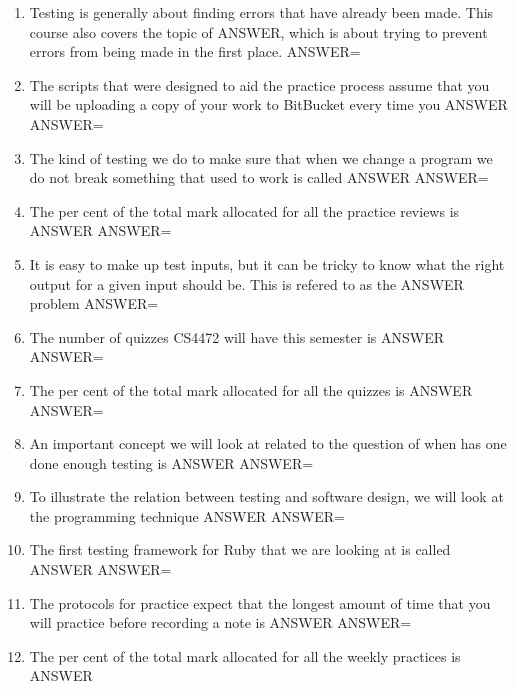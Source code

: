 \documentclass{exam}
\begin{document}
\begin{enumerate}
\item Testing is generally about finding errors that have already been made.  This course also covers the topic of ANSWER, which is about trying to prevent errors from being made in the first place.\newline
ANSWER=
\item The scripts that were designed to aid the practice process assume that you will be uploading a copy of your work to BitBucket every time you ANSWER\newline
ANSWER=
\item The kind of testing we do to make sure that when we change a program we do not break something that used to work is called ANSWER\newline
ANSWER=
\item The per cent of the total mark allocated for all the practice reviews is ANSWER\newline
ANSWER=
\item It is easy to make up test inputs, but it can be tricky to know what the right output for a given input should be.  This is refered to as the ANSWER problem\newline
ANSWER=
\item The number of quizzes CS4472 will have this semester is ANSWER\newline
ANSWER=
\item The per cent of the total mark allocated for all the quizzes is ANSWER\newline
ANSWER=
\item An important concept we will look at related to the question of when has one done enough testing is ANSWER\newline
ANSWER=
\item To illustrate the relation between testing and software design, we will look at the programming technique ANSWER\newline
ANSWER=
\item The first testing framework for Ruby that we are looking at is called ANSWER\newline
ANSWER=
\item The protocols for practice expect that the longest amount of time that you will practice before recording a note is ANSWER\newline
ANSWER=
\item The per cent of the total mark allocated for all the weekly practices is ANSWER\newline

\end{enumerate}
\end{document}
